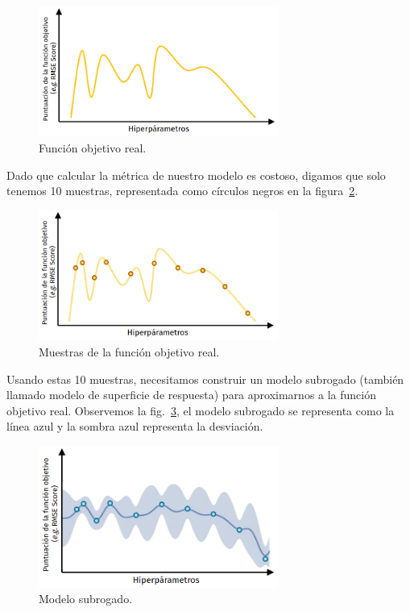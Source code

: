 \documentclass[a4paper,12pt]{article}
\begin{document}
\begin{figure}[H]
	\begin{center}
		\includegraphics[width=0.7\textwidth]{bayes_opt_6_v2.png}
		\caption{Función objetivo real.}
		\label{fig:bayes6}
	\end{center}
\end{figure}

Dado que calcular la métrica de nuestro modelo es costoso, digamos que solo tenemos 10 muestras, representada como círculos negros en la figura~\ref{fig:bayes7}.

\begin{figure}[H]
	\begin{center}
		\includegraphics[width=0.7\textwidth]{bayes_opt_7_v2.png}
		\caption{Muestras de la función objetivo real.}
		\label{fig:bayes7}
	\end{center}
\end{figure}

Usando estas 10 muestras, necesitamos construir un modelo subrogado (también llamado modelo de superficie de respuesta) para aproximarnos a la función objetivo real. Observemos la fig.~\ref{fig:bayes8}, el modelo subrogado se representa como la línea azul y la sombra azul representa la desviación.

\begin{figure}[H]
	\begin{center}
		\includegraphics[width=0.7\textwidth]{bayes_opt_8_v2.png}
		\caption{Modelo subrogado.}
		\label{fig:bayes8}
	\end{center}
\end{figure}
\end{document}
